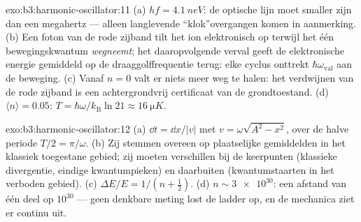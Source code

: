 \begin{solution}{exo:b3:harmonic-oscillator:11}
(a) $hf = \qty{4.1}{neV}$: de optische lijn moet smaller zijn dan een
megahertz --- alleen langlevende ``klok''overgangen komen in aanmerking.
(b) Een foton van de rode zijband tilt het ion elektronisch op terwijl
het één bewegingskwantum \emph{wegneemt}; het daaropvolgende
verval geeft de elektronische energie gemiddeld op de draaggolffrequentie
terug: elke cyclus onttrekt $\hbar\omega_{\text{val}}$ aan de beweging.
(c) Vanaf $n = 0$ valt er niets meer weg te halen: het verdwijnen van de
rode zijband is een achtergrondvrij certificaat van de grondtoestand. (d)
$\langle n\rangle = 0.05$: $T = \hbar\omega/k_{\text{B}}\ln21
\approx \qty{16}{\micro K}$.
\end{solution}

\begin{solution}{exo:b3:harmonic-oscillator:12}
(a) $\dd t = \dd x/|v|$ met $v = \omega\sqrt{A^2 - x^2}$, over de halve
periode $T/2 = \pi/\omega$. (b) Zij stemmen overeen op plaatselijke
gemiddelden in het klassiek toegestane gebied; zij moeten verschillen bij
de keerpunten (klassieke divergentie, eindige kwantumpieken) en daarbuiten
(kwantumstaarten in het verboden gebied). (c) $\Delta E/E = 1/(n +
\tfrac12)$. (d) $n \sim \num{3e30}$: een afstand van één deel op
$10^{30}$ --- geen denkbare meting lost de ladder op, en de mechanica ziet
er continu uit.
\end{solution}

